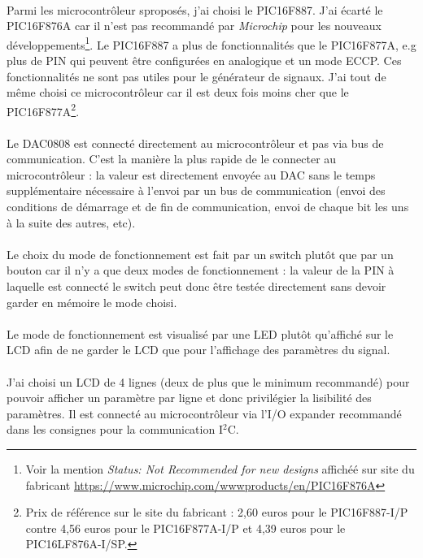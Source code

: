 \documentclass{article}
\begin{document}
    \paragraph{}
    Parmi les microcontrôleur sproposés, j'ai choisi le PIC16F887. J'ai écarté le PIC16F876A car il n'est pas recommandé par \emph{Microchip} pour les nouveaux développements\footnote{Voir la mention \emph{Status: Not Recommended for new designs} affichéé sur site du fabricant \url{https://www.microchip.com/wwwproducts/en/PIC16F876A}}. Le PIC16F887 a plus de fonctionnalités que le PIC16F877A, e.g plus de PIN qui peuvent être configurées en analogique et un mode ECCP. Ces fonctionnalités ne sont pas utiles pour le générateur de signaux. J'ai tout de même choisi ce microcontrôleur car il est deux fois moins cher que le PIC16F877A\footnote{Prix de référence sur le site du fabricant : 2,60 euros pour le PIC16F887-I/P contre 4,56 euros pour le PIC16F877A-I/P et 4,39 euros pour le PIC16LF876A-I/SP.}.

    \paragraph{}
    Le DAC0808 est connecté directement au microcontrôleur et pas via bus de communication. C'est la manière la plus rapide de le connecter au microcontrôleur : la valeur est directement envoyée au DAC sans le temps supplémentaire nécessaire à l'envoi par un bus de communication (envoi des conditions de démarrage et de fin de communication, envoi de chaque bit les uns à la suite des autres, etc).

    \paragraph{}
    Le choix du mode de fonctionnement est fait par un switch plutôt que par un bouton car il n'y a que deux modes de fonctionnement : la valeur de la PIN à laquelle est connecté le switch peut donc être testée directement sans devoir garder en mémoire le mode choisi.

    \paragraph{}
    Le mode de fonctionnement est visualisé par une LED plutôt qu'affiché sur le LCD afin de ne garder le LCD que pour l'affichage des paramètres du signal.

    \paragraph{}
    J'ai choisi un LCD de 4 lignes (deux de plus que le minimum recommandé) pour pouvoir afficher un paramètre par ligne et donc privilégier la lisibilité des paramètres. Il est connecté au microcontrôleur via l'I/O expander recommandé dans les consignes pour la communication I$^2$C.
\end{document}

